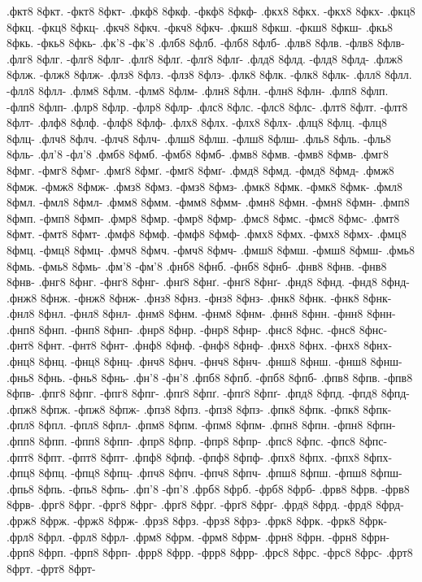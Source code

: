 {.фкт8 8фкт. -фкт8 8фкт-
.фкф8 8фкф. -фкф8 8фкф-
.фкх8 8фкх. -фкх8 8фкх-
.фкц8 8фкц. -фкц8 8фкц-
.фкч8 8фкч. -фкч8 8фкч-
.фкш8 8фкш. -фкш8 8фкш-
.фкь8 8фкь. -фкь8 8фкь-
.фк'8 -фк'8
.флб8 8флб. -флб8 8флб-
.флв8 8флв. -флв8 8флв-
.флг8 8флг. -флг8 8флг-
.флґ8 8флґ. -флґ8 8флґ-
.флд8 8флд. -флд8 8флд-
.флж8 8флж. -флж8 8флж-
.флз8 8флз. -флз8 8флз-
.флк8 8флк. -флк8 8флк-
.флл8 8флл. -флл8 8флл-
.флм8 8флм. -флм8 8флм-
.флн8 8флн. -флн8 8флн-
.флп8 8флп. -флп8 8флп-
.флр8 8флр. -флр8 8флр-
.флс8 8флс. -флс8 8флс-
.флт8 8флт. -флт8 8флт-
.флф8 8флф. -флф8 8флф-
.флх8 8флх. -флх8 8флх-
.флц8 8флц. -флц8 8флц-
.флч8 8флч. -флч8 8флч-
.флш8 8флш. -флш8 8флш-
.фль8 8фль. -фль8 8фль-
.фл'8 -фл'8
.фмб8 8фмб. -фмб8 8фмб-
.фмв8 8фмв. -фмв8 8фмв-
.фмг8 8фмг. -фмг8 8фмг-
.фмґ8 8фмґ. -фмґ8 8фмґ-
.фмд8 8фмд. -фмд8 8фмд-
.фмж8 8фмж. -фмж8 8фмж-
.фмз8 8фмз. -фмз8 8фмз-
.фмк8 8фмк. -фмк8 8фмк-
.фмл8 8фмл. -фмл8 8фмл-
.фмм8 8фмм. -фмм8 8фмм-
.фмн8 8фмн. -фмн8 8фмн-
.фмп8 8фмп. -фмп8 8фмп-
.фмр8 8фмр. -фмр8 8фмр-
.фмс8 8фмс. -фмс8 8фмс-
.фмт8 8фмт. -фмт8 8фмт-
.фмф8 8фмф. -фмф8 8фмф-
.фмх8 8фмх. -фмх8 8фмх-
.фмц8 8фмц. -фмц8 8фмц-
.фмч8 8фмч. -фмч8 8фмч-
.фмш8 8фмш. -фмш8 8фмш-
.фмь8 8фмь. -фмь8 8фмь-
.фм'8 -фм'8
.фнб8 8фнб. -фнб8 8фнб-
.фнв8 8фнв. -фнв8 8фнв-
.фнг8 8фнг. -фнг8 8фнг-
.фнґ8 8фнґ. -фнґ8 8фнґ-
.фнд8 8фнд. -фнд8 8фнд-
.фнж8 8фнж. -фнж8 8фнж-
.фнз8 8фнз. -фнз8 8фнз-
.фнк8 8фнк. -фнк8 8фнк-
.фнл8 8фнл. -фнл8 8фнл-
.фнм8 8фнм. -фнм8 8фнм-
.фнн8 8фнн. -фнн8 8фнн-
.фнп8 8фнп. -фнп8 8фнп-
.фнр8 8фнр. -фнр8 8фнр-
.фнс8 8фнс. -фнс8 8фнс-
.фнт8 8фнт. -фнт8 8фнт-
.фнф8 8фнф. -фнф8 8фнф-
.фнх8 8фнх. -фнх8 8фнх-
.фнц8 8фнц. -фнц8 8фнц-
.фнч8 8фнч. -фнч8 8фнч-
.фнш8 8фнш. -фнш8 8фнш-
.фнь8 8фнь. -фнь8 8фнь-
.фн'8 -фн'8
.фпб8 8фпб. -фпб8 8фпб-
.фпв8 8фпв. -фпв8 8фпв-
.фпг8 8фпг. -фпг8 8фпг-
.фпґ8 8фпґ. -фпґ8 8фпґ-
.фпд8 8фпд. -фпд8 8фпд-
.фпж8 8фпж. -фпж8 8фпж-
.фпз8 8фпз. -фпз8 8фпз-
.фпк8 8фпк. -фпк8 8фпк-
.фпл8 8фпл. -фпл8 8фпл-
.фпм8 8фпм. -фпм8 8фпм-
.фпн8 8фпн. -фпн8 8фпн-
.фпп8 8фпп. -фпп8 8фпп-
.фпр8 8фпр. -фпр8 8фпр-
.фпс8 8фпс. -фпс8 8фпс-
.фпт8 8фпт. -фпт8 8фпт-
.фпф8 8фпф. -фпф8 8фпф-
.фпх8 8фпх. -фпх8 8фпх-
.фпц8 8фпц. -фпц8 8фпц-
.фпч8 8фпч. -фпч8 8фпч-
.фпш8 8фпш. -фпш8 8фпш-
.фпь8 8фпь. -фпь8 8фпь-
.фп'8 -фп'8
.фрб8 8фрб. -фрб8 8фрб-
.фрв8 8фрв. -фрв8 8фрв-
.фрг8 8фрг. -фрг8 8фрг-
.фрґ8 8фрґ. -фрґ8 8фрґ-
.фрд8 8фрд. -фрд8 8фрд-
.фрж8 8фрж. -фрж8 8фрж-
.фрз8 8фрз. -фрз8 8фрз-
.фрк8 8фрк. -фрк8 8фрк-
.фрл8 8фрл. -фрл8 8фрл-
.фрм8 8фрм. -фрм8 8фрм-
.фрн8 8фрн. -фрн8 8фрн-
.фрп8 8фрп. -фрп8 8фрп-
.фрр8 8фрр. -фрр8 8фрр-
.фрс8 8фрс. -фрс8 8фрс-
.фрт8 8фрт. -фрт8 8фрт-
}
